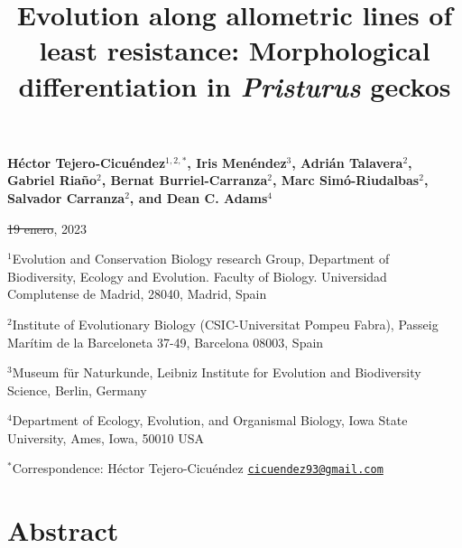 \documentclass[
  11pt,
]{article}
\title{Evolution along allometric lines of least resistance:
Morphological differentiation in \emph{Pristurus} geckos}
\author{}
\date{\vspace{-2.5em}}
\providecommand{\DIFaddtex}[1]{{\protect\color{blue}\uwave{#1}}} %
\providecommand{\DIFdeltex}[1]{{\protect\color{red}\sout{#1}}}                      %
\providecommand{\DIFaddbegin}{} %
\providecommand{\DIFaddend}{} %
\providecommand{\DIFdelbegin}{} %
\providecommand{\DIFdelend}{} %
\providecommand{\DIFadd}[1]{\texorpdfstring{\DIFaddtex{#1}}{#1}} %
\providecommand{\DIFdel}[1]{\texorpdfstring{\DIFdeltex{#1}}{}} %
\newcommand{\DIFscaledelfig}{0.5}
\newlength{\DIFdelgraphicswidth} %
\newlength{\DIFdelgraphicsheight} %
\newcommand{\DIFaddincludegraphics}[2][]{{\color{blue}\fbox{\DIFOincludegraphics[#1]{#2}}}} %
\newcommand{\DIFdelincludegraphics}[2][]{%
\sbox{\DIFdelgraphicsbox}{\DIFOincludegraphics[#1]{#2}}%
\settoboxwidth{\DIFdelgraphicswidth}{\DIFdelgraphicsbox} %
\settoboxtotalheight{\DIFdelgraphicsheight}{\DIFdelgraphicsbox} %
\scalebox{\DIFscaledelfig}{%
\parbox[b]{\DIFdelgraphicswidth}{\usebox{\DIFdelgraphicsbox}\\[-\baselineskip] \rule{\DIFdelgraphicswidth}{0em}}\llap{\resizebox{\DIFdelgraphicswidth}{\DIFdelgraphicsheight}{%
\setlength{\unitlength}{\DIFdelgraphicswidth}%
\begin{picture}(1,1)%
\thicklines\linethickness{2pt} %
{\color[rgb]{1,0,0}\put(0,0){\framebox(1,1){}}}%
{\color[rgb]{1,0,0}\put(0,0){\line( 1,1){1}}}%
{\color[rgb]{1,0,0}\put(0,1){\line(1,-1){1}}}%
\end{picture}%
}\hspace*{3pt}}} %
} %
\DeclareRobustCommand{\DIFaddbegin}{\DIFOaddbegin \let\includegraphics\DIFaddincludegraphics} %
\DeclareRobustCommand{\DIFaddend}{\DIFOaddend \let\includegraphics\DIFOincludegraphics} %
\DeclareRobustCommand{\DIFdelbegin}{\DIFOdelbegin \let\includegraphics\DIFdelincludegraphics} %
\DeclareRobustCommand{\DIFdelend}{\DIFOaddend \let\includegraphics\DIFOincludegraphics} %
\begin{document}
\maketitle

\begin{center}
\textbf{H{\'{e}}ctor Tejero-Cicu{\'{e}}ndez$^{1,2,*}$,  Iris Men{\'{e}}ndez$^{3}$, Adri{\'{a}}n Talavera$^{2}$, Gabriel Riaño$^{2}$, Bernat Burriel-Carranza$^{2}$, Marc Sim{\'{o}}-Riudalbas$^{2}$, Salvador Carranza$^{2}$, and Dean C. Adams$^{4}$}
\end{center}

\begin{center}\DIFdelbegin \DIFdel{19 enero}\DIFdelend \DIFaddbegin \DIFadd{11 April}\DIFaddend , 2023\end{center}

\(^{1}\)Evolution and Conservation Biology research Group, Department of
Biodiversity, Ecology and Evolution. Faculty of Biology. Universidad
Complutense de Madrid, 28040, Madrid, Spain

\(^{2}\)Institute of Evolutionary Biology (CSIC-Universitat Pompeu
Fabra), Passeig Marítim de la Barceloneta 37-49, Barcelona 08003, Spain

\(^{3}\)Museum für Naturkunde, Leibniz Institute for Evolution and
Biodiversity Science, Berlin, Germany

\(^{4}\)Department of Ecology, Evolution, and Organismal Biology, Iowa
State University, Ames, Iowa, 50010 USA

\(^{*}\)Correspondence: Héctor Tejero-Cicuéndez
\href{mailto:cicuendez93@gmail.com}{\nolinkurl{cicuendez93@gmail.com}}

\newpage

\hypertarget{abstract}{%
\section{Abstract}\label{abstract}}
\end{document}
